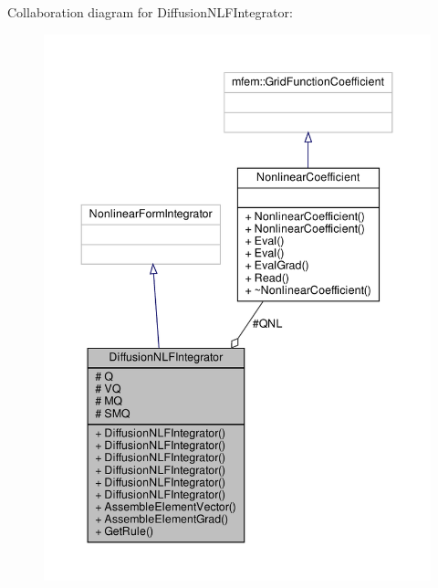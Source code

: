 Collaboration diagram for Diffusion\+N\+L\+F\+Integrator\+:\nopagebreak
\begin{figure}[H]
\begin{center}
\leavevmode
\includegraphics[width=350pt]{classDiffusionNLFIntegrator__coll__graph}
\end{center}
\end{figure}
